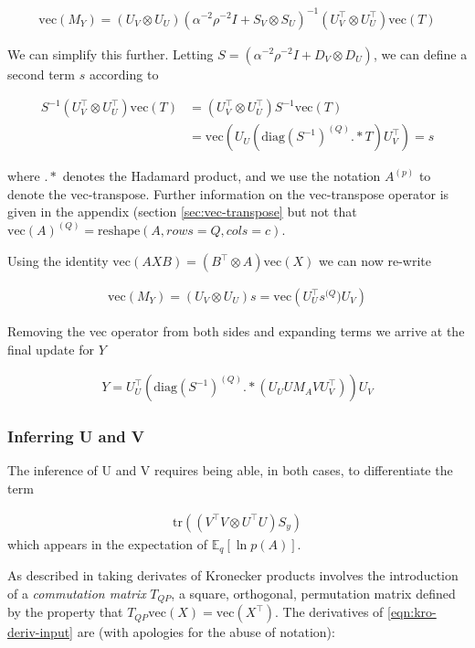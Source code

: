 \documentclass[10pt,fleqn]{article}
\newcommand \vecf[1] {
    \text{vec}\left(#1\right)
}
\newcommand \ex[2] {
    \mathbb{E}_{ { #2 } }\left[ #1 \right]
}
\newcommand \tr { \text{tr} }
\newcommand \T { ^\top }
\newcommand \diag[1] { \text{diag} \left( {#1} \right) }
\newcommand \Tr[1]   { \tr \left(  {#1}  \right) }
\newcommand \inv[1] { {#1}^{-1} }
\newcommand \invb[1] { \inv{\left( #1 \right)} }
\begin{document}
\begin{align}
\vecf{M_Y} = (U_V \otimes U_U)
  \invb{\alpha^{-2}\rho^{-2} I + S_V \otimes S_U}
  (U_V^\top \otimes U_U^\top) \vecf{T}
\end{align}

We can simplify this further. Letting $S = (\alpha^{-2}\rho^{-2} I + D_V \otimes D_U)$, we can define a second term $s$ according to

\begin{align}
S^{-1}(U_V^\top \otimes U_U^\top) \vecf{T} 
& =
(U_V^\top \otimes U_U^\top)S^{-1} \vecf{T} \\
& =
\vecf{U_U (\text{diag}(S^{-1})^{(Q)} .* T) U_V^\top} = s
\end{align}

where $.*$ denotes the Hadamard product, and we use the notation $A^{(p)}$ to denote the vec-transpose\cite{Minka2000a}. Further information on the vec-transpose operator is given in the appendix (section \ref{sec:vec-transpose} but not that $\vecf{A}^{(Q)} = \text{reshape}(A, rows=Q, cols=c)$.

Using the identity $\vecf{AXB} = (B\T \otimes A)\vecf{X}$ we can now re-write

\begin{align}
\vecf{M_Y} = (U_V \otimes U_U)s = \vecf{U_U^\top s^{(Q}) U_V}
\end{align}

Removing the vec operator from both sides and expanding terms we arrive at the final update for $Y$

\begin{align}
Y = U_U^\top (\diag{\inv{S}}^{(Q)} .* (U_U U M_A V U_V^\top)) U_V
\end{align}

\subsubsection{Inferring U and V}
The inference of U and V requires being able, in both cases, to differentiate the term

\begin{align}
\Tr{(V\T V \otimes U\T U)S_y} \label{eqn:kro-deriv-input}
\end{align}
which appears in the expectation of $\ex{\ln p(A)}{q}$.

As described in \cite{Minka2000a} taking derivates of Kronecker products involves the introduction of a \emph{commutation matrix} $T_{QP}$, a square, orthogonal, permutation matrix defined by the property that $T_{QP} \vecf{X} = \vecf{X\T}$. The derivatives of \eqref{eqn:kro-deriv-input} are (with apologies for the abuse of notation):
\end{document}
